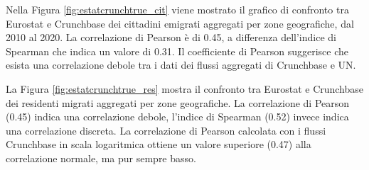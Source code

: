 Nella Figura \ref{fig:estatcrunchtrue_cit} viene mostrato il grafico di confronto tra Eurostat e Crunchbase dei cittadini emigrati aggregati per zone geografiche, dal 2010 al 2020.
La correlazione di Pearson è di 0.45, a differenza dell'indice di Spearman che indica un valore di 0.31. Il coefficiente  di Pearson suggerisce che esista una correlazione debole tra i dati dei flussi aggregati di Crunchbase e UN.


La Figura \ref{fig:estatcrunchtrue_res} mostra il confronto tra Eurostat e Crunchbase dei residenti migrati aggregati per zone geografiche. La correlazione di Pearson (0.45) indica una correlazione debole, l'indice di Spearman (0.52) invece indica una correlazione discreta. La correlazione di Pearson calcolata con i flussi Crunchbase in scala logaritmica ottiene un valore superiore (0.47) alla correlazione normale, ma pur sempre basso.

